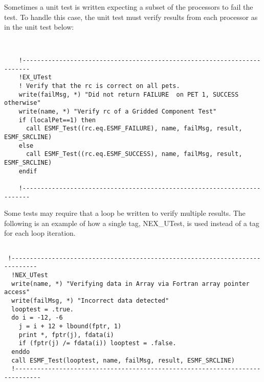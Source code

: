 Sometimes a unit test is written expecting a subset of the processors to fail the test. To
handle this case, the unit test must verify results from each processor as in the unit test below:
\begin{verbatim}


    !------------------------------------------------------------------------
    !EX_UTest
    ! Verify that the rc is correct on all pets.
    write(failMsg, *) "Did not return FAILURE  on PET 1, SUCCESS otherwise"
    write(name, *) "Verify rc of a Gridded Component Test"
    if (localPet==1) then
      call ESMF_Test((rc.eq.ESMF_FAILURE), name, failMsg, result, ESMF_SRCLINE)
    else
      call ESMF_Test((rc.eq.ESMF_SUCCESS), name, failMsg, result, ESMF_SRCLINE)
    endif

    !------------------------------------------------------------------------

\end{verbatim}

Some tests may require that a loop be written to verify multiple results. The following is
an example of how a single tag, NEX\_UTest, is used instead of a tag for each loop iteration.

\begin{verbatim}

 !-----------------------------------------------------------------------------
  !NEX_UTest
  write(name, *) "Verifying data in Array via Fortran array pointer access"
  write(failMsg, *) "Incorrect data detected"
  looptest = .true.
  do i = -12, -6
    j = i + 12 + lbound(fptr, 1)
    print *, fptr(j), fdata(i)
    if (fptr(j) /= fdata(i)) looptest = .false.
  enddo
  call ESMF_Test(looptest, name, failMsg, result, ESMF_SRCLINE)
  !-----------------------------------------------------------------------------

\end{verbatim}

